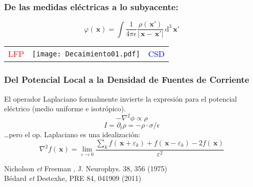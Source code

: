 \documentclass{beamer}
\newcommand{\dd}{\, \mathrm{d}}
\newcommand{\xq}{\, \mathbf{x}}
\begin{document}
\begin{frame}
  \frametitle{De las medidas eléctricas a lo subyacente:} 
  \begin{equation}
    \varphi(\xq)
    =\int \frac{1}{4\pi\epsilon}
    \frac{\rho(\xq')}{|\xq-\xq'|} \dd^3 \xq'  
  \end{equation}
  \begin{center}
  \begin{tabular}{ccc}
   \textcolor{red}{LFP} & 
   \texttt{[image: Decaimiento01.pdf]} &
   \textcolor{blue}{CSD}
  \end{tabular}
  \end{center}
\end{frame}


\begin{frame}
\frametitle{Del Potencial Local a la Densidad de Fuentes de Corriente} 
El operador Laplaciano formalmente invierte la expresión para
el potencial eléctrico (medio uniforme e isotrópico).
\begin{equation}
  -\nabla^2\phi \propto \rho
\end{equation}
\begin{equation}
I=\partial_t \rho= - \rho \cdot \sigma/\epsilon 
  \end{equation}
\ldots pero el op. Laplaciano es una idealización:
\begin{equation}
  \nabla^2 f (\xq) =\lim_{\varepsilon \to 0}
  \frac{\sum_k f(\xq+\varepsilon_k)+ f(\xq-\varepsilon_k)-2 f(\xq)}
       {\varepsilon^2}  
\end{equation}
\begin{flushright}
  {\tiny Nicholson \emph{et} Freeman , J.   Neurophys. 38, 356 (1975)\\
         Bédard \emph{et} Destexhe, PRE 84, 041909 (2011) }
\end{flushright}

\end{frame}
\end{document}
